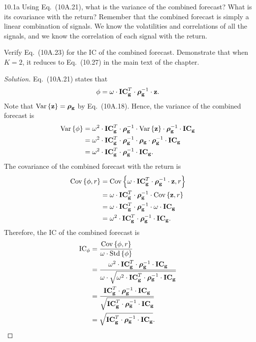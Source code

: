 \begin{problem}{10.1a}
Using Eq.\ (10A.21), what is the variance of the combined forecast? What is its covariance with the return? Remember that the combined forecast is simply a linear combination of signals. We know the volatilities and correlations of all the signals, and we know the correlation of each signal with the return.

Verify Eq.\ (10A.23) for the IC of the combined forecast. Demonstrate that when $K = 2$, it reduces to Eq.\ (10.27) in the main text of the chapter. 
\end{problem}

\begin{proof}[Solution]
Eq.\ (10A.21) states that \[\phi = \omega \cdot \bm{\mathrm{IC}}_{\mathbf{g}}^{T} \cdot \bm{\rho}_{\mathbf{g}}^{-1} \cdot \mathbf{z}.\] Note that $\mathrm{Var}\left\lbrace\mathbf{z}\right\rbrace = \bm{\rho}_{\mathbf{g}}$ by Eq.\ (10A.18). Hence, the variance of the combined forecast is
\begin{align*}
\mathrm{Var}\left\lbrace\phi\right\rbrace &= \omega^{2} \cdot \bm{\mathrm{IC}}_{\mathbf{g}}^{T} \cdot \bm{\rho}_{\mathbf{g}}^{-1} \cdot \mathrm{Var}\left\lbrace\mathbf{z}\right\rbrace \cdot \bm{\rho}_{\mathbf{g}}^{-1} \cdot \bm{\mathrm{IC}}_{\mathbf{g}}\\
&= \omega^{2} \cdot \bm{\mathrm{IC}}_{\mathbf{g}}^{T} \cdot \bm{\rho}_{\mathbf{g}}^{-1} \cdot \bm{\rho}_{\mathbf{g}} \cdot \bm{\rho}_{\mathbf{g}}^{-1} \cdot \bm{\mathrm{IC}}_{\mathbf{g}}\\
&= \omega^{2} \cdot \bm{\mathrm{IC}}_{\mathbf{g}}^{T} \cdot \bm{\rho}_{\mathbf{g}}^{-1} \cdot \bm{\mathrm{IC}}_{\mathbf{g}}.
\end{align*}
The covariance of the combined forecast with the return is
\begin{align*}
\mathrm{Cov}\left\lbrace\phi, r\right\rbrace &= \mathrm{Cov}\left\lbrace\omega \cdot \bm{\mathrm{IC}}_{\mathbf{g}}^{T} \cdot \bm{\rho}_{\mathbf{g}}^{-1} \cdot \mathbf{z}, r\right\rbrace\\
&= \omega \cdot \bm{\mathrm{IC}}_{\mathbf{g}}^{T} \cdot \bm{\rho}_{\mathbf{g}}^{-1} \cdot \mathrm{Cov}\left\lbrace\mathbf{z}, r\right\rbrace\\
&= \omega \cdot \bm{\mathrm{IC}}_{\mathbf{g}}^{T} \cdot \bm{\rho}_{\mathbf{g}}^{-1} \cdot \omega \cdot \bm{\mathrm{IC}}_{\mathbf{g}}\\
&= \omega^{2} \cdot \bm{\mathrm{IC}}_{\mathbf{g}}^{T} \cdot \bm{\rho}_{\mathbf{g}}^{-1} \cdot \bm{\mathrm{IC}}_{\mathbf{g}}.
\end{align*}
Therefore, the IC of the combined forecast is
\begin{align*}
\mathrm{IC}_{\phi} &= \frac{\cov{\phi, r}}{\omega \cdot \std{\phi}}\\
&= \frac{\omega^{2} \cdot \IC_{\g}^{T} \cdot \brho_{\g}^{-1} \cdot \IC_{\g}}{\omega \cdot \sqrt{\omega^{2} \cdot \IC_{\g}^{T} \cdot \brho_{\g}^{-1} \cdot \IC_{\g}}}\\
&= \frac{\IC_{\g}^{T} \cdot \brho_{\g}^{-1} \cdot \IC_{\g}}{\sqrt{\IC_{\g}^{T} \cdot \brho_{\g}^{-1} \cdot \IC_{\g}}}\\
&= \sqrt{\IC_{\g}^{T} \cdot \brho_{\g}^{-1} \cdot \IC_{\g}}.

\end{align*}
\end{proof}
